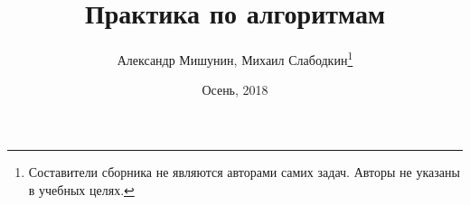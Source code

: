 \documentclass{article}
\title{Практика по алгоритмам}
\author{Александр Мишунин, Михаил Слабодкин\footnote{Составители сборника не являются авторами самих задач. Авторы не указаны в учебных целях.}}
\date{Осень, 2018}
\begin{document}
\maketitle

\pagebreak 
\end{document}
